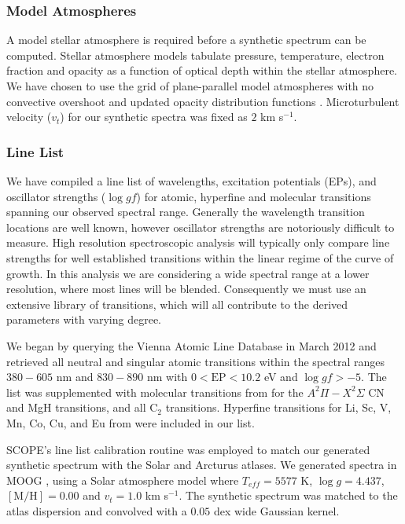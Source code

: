 \documentclass{emulateapj}
\begin{document}
\subsubsection{Model Atmospheres}
A model stellar atmosphere is required before a synthetic spectrum can be computed. Stellar atmosphere models tabulate pressure, temperature, electron fraction and opacity as a function of optical depth within the stellar atmosphere. We have chosen to use the \citet{Castelli;Kurucz_2004} grid of plane-parallel model atmospheres with no convective overshoot \citep{Castelli;Kurucz_1997} and updated opacity distribution functions \citep{Castelli;Kurucz_2003}. Microturbulent velocity ($v_t$) for our synthetic spectra was fixed as $2$ km s$^{-1}$.

\subsubsection{Line List}
We have compiled a line list of wavelengths, excitation potentials (EPs), and oscillator strengths ($\log{gf}$) for atomic, hyperfine and molecular transitions spanning our observed spectral range. Generally the wavelength transition locations are well known, however oscillator strengths are notoriously difficult to measure. High resolution spectroscopic analysis will typically only compare line strengths for well established transitions within the linear regime of the curve of growth. In this analysis we are considering a wide spectral range at a lower resolution, where most lines will be blended. Consequently we must use an extensive library of transitions, which will all contribute to the derived parameters with varying degree.

We began by querying the Vienna Atomic Line Database \citep[VALD][]{Kupka;et-al_1999} in March 2012 and retrieved all neutral and singular atomic transitions within the spectral ranges $380-605$ nm and $830-890$ nm with $0 < \mbox{EP} < 10.2$ eV and $\log{gf} > -5$. The list was supplemented with molecular transitions from \citet{Kurucz_1992} for the $A^2\Pi-X^{2}\Sigma$ CN and MgH transitions, and all C$_2$ transitions. Hyperfine transitions for Li, Sc, V, Mn, Co, Cu, and Eu from \citet{Kurucz_1993} were included in our list. 

SCOPE's line list calibration routine was employed to match our generated synthetic spectrum with the Solar \citep{Wallace;et-al_2011} and Arcturus \citep{Hinkle;et-al_2003} atlases. We generated spectra in MOOG \citep[see \S\ref{sec:synth-generation}]{Sneden_1973}, using a Solar atmosphere model where $T_{eff}= 5577$ K, $\log{g} = 4.437$, $[\mbox{M}/\mbox{H}] = 0.00$ and $v_{t} = 1.0$ km s$^{-1}$. The synthetic spectrum was matched to the atlas dispersion and convolved with a $0.05$ dex wide Gaussian kernel.
\end{document}
